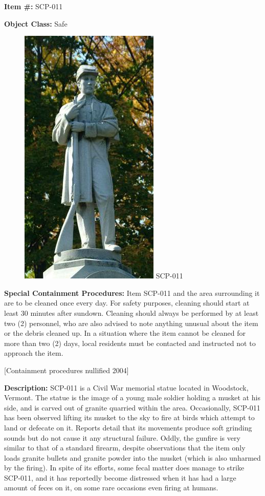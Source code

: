 
\textbf{Item \#:} SCP-011

\textbf{Object Class:} Safe

\begin{figure}[h]
\begin{center}
\includegraphics[scale=0.6]{scp/011.jpg}
\linebreak SCP-011
\end{center}
\end{figure}

\textbf{Special Containment Procedures:} Item SCP-011 and the area surrounding it are to be cleaned once every day. For safety purposes, cleaning should start at least 30 minutes after sundown. Cleaning should always be performed by at least two (2) personnel, who are also advised to note anything unusual about the item or the debris cleaned up. In a situation where the item cannot be cleaned for more than two (2) days, local residents must be contacted and instructed not to approach the item.

[Containment procedures nullified 2004]

\textbf{Description:} SCP-011 is a Civil War memorial statue located in Woodstock, Vermont. The statue is the image of a young male soldier holding a musket at his side, and is carved out of granite quarried within the area. Occasionally, SCP-011 has been observed lifting its musket to the sky to fire at birds which attempt to land or defecate on it. Reports detail that its movements produce soft grinding sounds but do not cause it any structural failure. Oddly, the gunfire is very similar to that of a standard firearm, despite observations that the item only loads granite bullets and granite powder into the musket (which is also unharmed by the firing). In spite of its efforts, some fecal matter does manage to strike SCP-011, and it has reportedly become distressed when it has had a large amount of feces on it, on some rare occasions even firing at humans.

